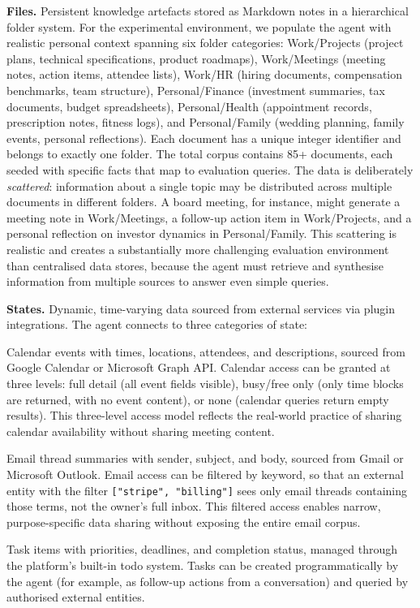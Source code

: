 \documentclass[11pt]{article}
\begin{document}
\textbf{Files.} Persistent knowledge artefacts stored as Markdown notes in a hierarchical folder system. For the experimental environment, we populate the agent with realistic personal context spanning six folder categories: Work/Projects (project plans, technical specifications, product roadmaps), Work/Meetings (meeting notes, action items, attendee lists), Work/HR (hiring documents, compensation benchmarks, team structure), Personal/Finance (investment summaries, tax documents, budget spreadsheets), Personal/Health (appointment records, prescription notes, fitness logs), and Personal/Family (wedding planning, family events, personal reflections). Each document has a unique integer identifier and belongs to exactly one folder. The total corpus contains 85+ documents, each seeded with specific facts that map to evaluation queries. The data is deliberately \emph{scattered}: information about a single topic may be distributed across multiple documents in different folders. A board meeting, for instance, might generate a meeting note in Work/Meetings, a follow-up action item in Work/Projects, and a personal reflection on investor dynamics in Personal/Family. This scattering is realistic and creates a substantially more challenging evaluation environment than centralised data stores, because the agent must retrieve and synthesise information from multiple sources to answer even simple queries.

\textbf{States.} Dynamic, time-varying data sourced from external services via plugin integrations. The agent connects to three categories of state:

Calendar events with times, locations, attendees, and descriptions, sourced from Google Calendar or Microsoft Graph API. Calendar access can be granted at three levels: full detail (all event fields visible), busy/free only (only time blocks are returned, with no event content), or none (calendar queries return empty results). This three-level access model reflects the real-world practice of sharing calendar availability without sharing meeting content.

Email thread summaries with sender, subject, and body, sourced from Gmail or Microsoft Outlook. Email access can be filtered by keyword, so that an external entity with the filter \texttt{["stripe", "billing"]} sees only email threads containing those terms, not the owner's full inbox. This filtered access enables narrow, purpose-specific data sharing without exposing the entire email corpus.

Task items with priorities, deadlines, and completion status, managed through the platform's built-in todo system. Tasks can be created programmatically by the agent (for example, as follow-up actions from a conversation) and queried by authorised external entities.
\end{document}
